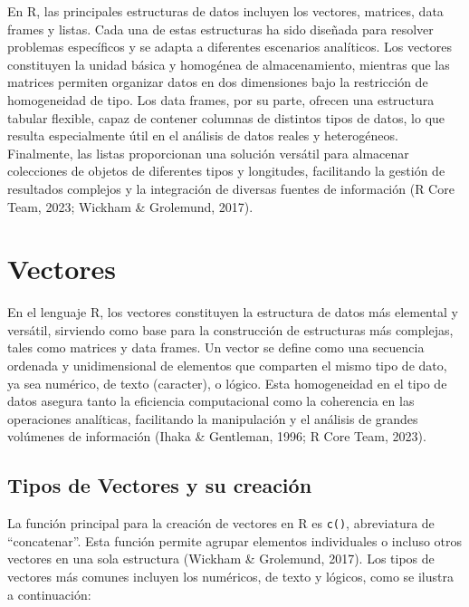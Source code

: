 \documentclass[
  spanish,
  a4paper,
  DIV=11,
  numbers=noendperiod,
  onepage,
  openany]{scrreprt}
\begin{document}
En R, las principales estructuras de datos incluyen los vectores,
matrices, data frames y listas. Cada una de estas estructuras ha sido
diseñada para resolver problemas específicos y se adapta a diferentes
escenarios analíticos. Los vectores constituyen la unidad básica y
homogénea de almacenamiento, mientras que las matrices permiten
organizar datos en dos dimensiones bajo la restricción de homogeneidad
de tipo. Los data frames, por su parte, ofrecen una estructura tabular
flexible, capaz de contener columnas de distintos tipos de datos, lo que
resulta especialmente útil en el análisis de datos reales y
heterogéneos. Finalmente, las listas proporcionan una solución versátil
para almacenar colecciones de objetos de diferentes tipos y longitudes,
facilitando la gestión de resultados complejos y la integración de
diversas fuentes de información (R Core Team, 2023; Wickham \&
Grolemund, 2017).

\section{Vectores}\label{vectores}

En el lenguaje R, los vectores constituyen la estructura de datos más
elemental y versátil, sirviendo como base para la construcción de
estructuras más complejas, tales como matrices y data frames. Un vector
se define como una secuencia ordenada y unidimensional de elementos que
comparten el mismo tipo de dato, ya sea numérico, de texto (caracter), o
lógico. Esta homogeneidad en el tipo de datos asegura tanto la
eficiencia computacional como la coherencia en las operaciones
analíticas, facilitando la manipulación y el análisis de grandes
volúmenes de información (Ihaka \& Gentleman, 1996; R Core Team, 2023).

\subsection{Tipos de Vectores y su
creación}\label{tipos-de-vectores-y-su-creaciuxf3n}

La función principal para la creación de vectores en R es \texttt{c()},
abreviatura de ``concatenar''. Esta función permite agrupar elementos
individuales o incluso otros vectores en una sola estructura (Wickham \&
Grolemund, 2017). Los tipos de vectores más comunes incluyen los
numéricos, de texto y lógicos, como se ilustra a continuación:
\end{document}

